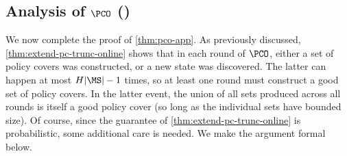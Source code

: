 \subsection{Analysis of $\PCO$ ()}\label{sec:pco-analysis}

We now complete the proof of \cref{thm:pco-app}. As previously discussed, \cref{thm:extend-pc-trunc-online} shows that in each round of $\PCO$, either a set of policy covers was constructed, or a new state was discovered. The latter can happen at most $H|\MS|-1$ times, so at least one round must construct a good set of policy covers. In the latter event, the union of all sets produced across all rounds is itself a good policy cover (so long as the individual sets have bounded size). 
Of course, since the guarantee of \cref{thm:extend-pc-trunc-online} is probabilistic, some additional care is needed. We make the argument formal below.

\vspace{1em}

\iffalse
\begin{theorem}\label{thm:pco-final-guarantee}
There is a constant $C>0$ so that the following holds. Let $\epfinal,\delta \in (0,1)$ and $N \in \NN$. Suppose that $\Reg$ is an $\Nreg$-efficient two-context regression oracle, and 
\[N \geq \Nreg\left(\left(\frac{\epfinal\delta}{H|\MA||\MS|}\right)^C,\left(\frac{\epfinal\delta}{H|\MA||\MS|}\right)^C\right).\]
Let $\Psi$ denote the output of $\PCO(\Reg,\delta,\epfinal,N)$. Then $|\Psi| \leq H^2|\MS|^2$ for each $h \in [H]$. Moreover, with probability at least $1-\delta$, it holds for each $h \in [H]$ and $s \in \MS$ that \begin{equation} \max_{\pi' \in \Psi} d^{M,\pi'}_h(s) \geq \max_{\pi \in \Pi} d^{M,\pi}_h(s) - \epfinal.\label{eq:pco-requirement}
\end{equation}
\end{theorem}
\fi

